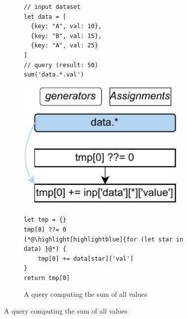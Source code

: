 \documentclass[runningheads]{llncs}
\begin{document}
\begin{figure}[t!]
\begin{subfigure}{\textwidth}
\begin{minipage}{0.25\textwidth}
\begin{lstlisting}[style=JavaScript, columns=flexible]
// input dataset
let data = [
  {key: "A", val: 10},
  {key: "B", val: 15},
  {key: "A", val: 25}
]
// query (result: 50)
sum('data.*.val')
\end{lstlisting}
\end{minipage}
\begin{minipage}{0.21\textwidth}
\centering
\includegraphics[width=0.9\textwidth]{images/intro_q1_ir.pdf}
\end{minipage}
\begin{minipage}{0.54\textwidth}
\begin{lstlisting}[style=JavaScript, columns=flexible]
let tmp = {}
tmp[0] ??= 0
(*@\highlight[highlightblue]{for (let star in data) }@*) {
    tmp[0] += data[star]['val']
}
return tmp[0]
\end{lstlisting}
\end{minipage}
\caption{A query computing the sum of all values}\label{fig:intro_q1}
\end{subfigure}


\end{figure}
\end{document}
